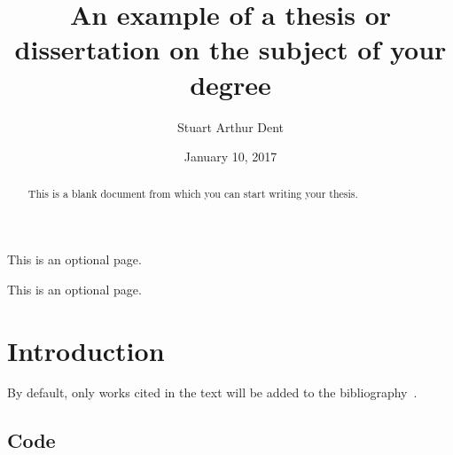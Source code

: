 \documentclass{sfuthesis}
\title{An example of a thesis or dissertation on the subject of your degree}
\author{Stuart Arthur Dent}
\date{January 10, 2017}
\begin{document}
\frontmatter
\maketitle{}
\makecommittee{}


\begin{abstract}
	This is a blank document from which you can start writing your thesis.
\end{abstract}


\begin{dedication}
	This is an optional page.
\end{dedication}


\begin{acknowledgements}
	This is an optional page.
\end{acknowledgements}

%
\tableofcontents%
\clearpage

%
\listoftables%
\clearpage

%
\listoffigures%
\clearpage





%
%

\mainmatter%

\chapter{Introduction}

By default, only works cited in the text will be added to the bibliography~\cite{latexcompanion}.



%
%
%
%
%

\backmatter%
	
	

\begin{appendices} %
	\chapter{Code}
\end{appendices}
\end{document}
